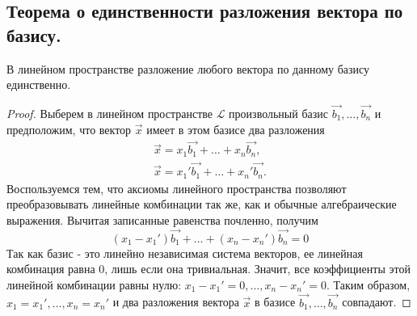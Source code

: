 \subsection{
    Теорема о единственности разложения вектора по базису.
}

\begin{theorem}
    В линейном пространстве разложение любого вектора по данному базису единственно.
    \label{thm:theorem_2_3}
\end{theorem}

\begin{proof}
    Выберем в линейном пространстве $\mathcal{L}$ произвольный базис $\vec{b_1}, \ldots, \vec{b_n}$ и предположим, что вектор $\vec{x}$ имеет в этом базисе два разложения
    \begin{align*}
        \vec{x} = x_1\vec{b_1} + \ldots + x_n\vec{b_n},\\
        \vec{x} = x_1'\vec{b_1} + \ldots + x_n'\vec{b_n}.
    \end{align*}
    Воспользуемся тем, что аксиомы линейного пространства позволяют преобразовывать линейные комбинации так же, как и обычные алгебраические выражения. Вычитая записанные равенства почленно, получим
    $$(x_1 - x_1')\vec{b_1} + \ldots + (x_n - x_n')\vec{b_n} = 0$$
    Так как базис - это линейно независимая система векторов, ее линейная комбинация равна $0$, лишь если она тривиальная. Значит, все коэффициенты этой линейной комбинации равны нулю: $x_1 - x_1' = 0, \ldots, x_n - x_n' = 0$. Таким образом, $x_1 = x_1', \ldots, x_n = x_n'$ и два разложения вектора $\vec{x}$ в базисе $\vec{b_1}, \ldots, \vec{b_n}$ совпадают.
\end{proof}

